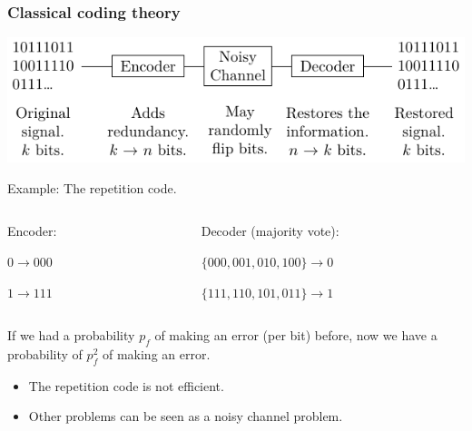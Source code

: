 \documentclass{beamer}
\renewcommand{\(}{\left(}
\renewcommand{\)}{\right)}
\renewcommand{\[}{\left[}
\renewcommand{\]}{\right]}
\begin{document}
\begin{frame}
    \frametitle{Classical coding theory}
    \begin{center}
    \includegraphics[scale=1]{classical_code_theory.pdf}
    \end{center}
    \pause
    Example: The repetition code. 
    \vspace{5pt}
    \begin{columns}
        \begin{column}{0.5\textwidth}
            \centering
            Encoder:
            
            $0 \rightarrow 000 $ 

            $1 \rightarrow 111 $ 

        \end{column}
        \begin{column}{0.5\textwidth}
            \centering
            Decoder (majority vote): 
            
            $\{000,001,010,100\} \rightarrow 0$ 

            $\{111,110,101,011\} \rightarrow 1 $ 
        \end{column}
    \end{columns}
    \vspace{10pt}
    If we had a probability $p_f$ of making an error (per bit) before, now we have a probability of $p_f^2$ of making an error. 
    \pause
    \begin{itemize}
        \item The repetition code is not efficient. 
        \item Other problems can be seen as a noisy channel problem. 
    \end{itemize}

\end{frame}
\end{document}

